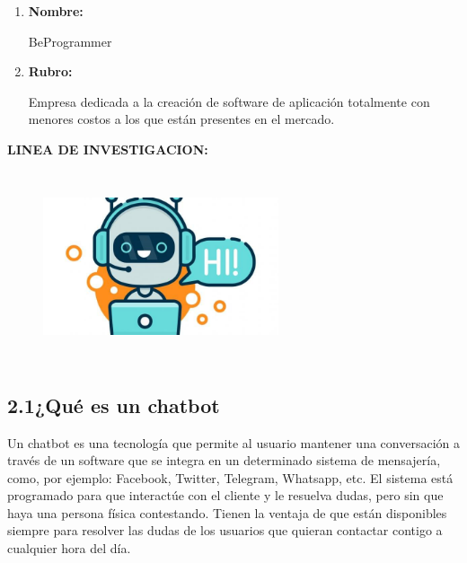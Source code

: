 \documentclass[12pt]{report}
\begin{document}
\begin{enumerate}
	\item \textbf{Nombre:}\par

{\fontsize{10pt}{12.0pt}\selectfont BeProgrammer\par}\par


\vspace{\baselineskip}
	\item \textbf{Rubro:}\par

{\fontsize{10pt}{12.0pt}\selectfont Empresa dedicada a la creación de software de aplicación totalmente con menores costos a los que están presentes en el mercado.\par}\par


\vspace{\baselineskip}

\end{enumerate}
	\item \textbf{LINEA DE INVESTIGACION:}\par




\begin{figure}[H]
\advance\leftskip -0.07in		\includegraphics[width=2.73in,height=2.21in]{./media/image2.jpeg}
\end{figure}



\subsection*{2.1\hspace*{10pt}¿Qué es un chatbot}
{\fontsize{10pt}{12.0pt}\selectfont Un chatbot es una tecnología que permite al usuario mantener una conversación a través de un software que se integra en un determinado sistema de mensajería, como, por ejemplo: Facebook, Twitter, Telegram, Whatsapp, etc. El sistema está programado para que interactúe con el cliente y le resuelva dudas, pero sin que haya una persona física contestando. Tienen la ventaja de que están disponibles siempre para resolver las dudas de los usuarios que quieran contactar contigo a cualquier hora del día.\par}\par
\end{document}
